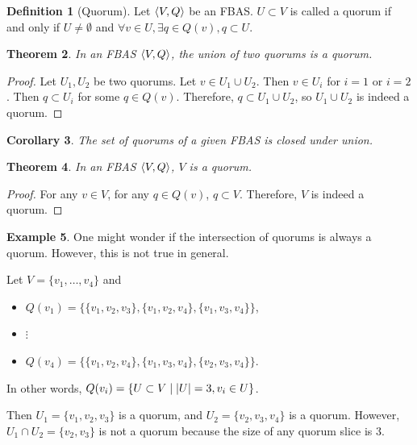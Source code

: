 \documentclass[12pt, psamsfonts]{amsart}
\newtheorem{thm}{Theorem}[subsection]
\newtheorem{cor}[thm]{Corollary}
\theoremstyle{definition}
\newtheorem{defn}[thm]{Definition}
\newtheorem{exmp}[thm]{Example}
\theoremstyle{remark}
\numberwithin{equation}{subsection}
\begin{document}
\begin{defn}[Quorum]
    Let $\ev{V, Q}$ be an FBAS\@.
    $U \subset V$ is called a quorum if and only if $U \ne \emptyset$ and $\forall v \in U, \exists q \in Q(v), q \subset U$.
\end{defn}

\begin{thm}\label{union_quorums}
    In an FBAS $\ev{V, Q}$, the union of two quorums is a quorum.
\end{thm}

\begin{proof}
    Let $U_1, U_2$ be two quorums.
    Let $v \in U_1 \cup U_2$.
    Then $v \in U_i$ for $i = 1$ or $i = 2$.
    Then $q \subset U_i$ for some $q \in Q(v)$.
    Therefore, $q \subset U_1 \cup U_2$, so $U_1 \cup U_2$ is indeed a quorum.
\end{proof}

\begin{cor}
    The set of quorums of a given FBAS is closed under union.
\end{cor}

\begin{thm}
    In an FBAS $\ev{V, Q}$, $V$ is a quorum.
\end{thm}

\begin{proof}
    For any $v \in V$, for any $q \in Q(v)$, $q \subset V$.
    Therefore, $V$ is indeed a quorum.
\end{proof}

\begin{exmp}
    One might wonder if the intersection of quorums is always a quorum.
    However, this is not true in general.

    Let $V = \{ v_1, \ldots, v_4 \}$ and
    \begin{itemize}
        \item
            $Q(v_1) = \{ \{ v_1, v_2, v_3 \}, \{ v_1, v_2, v_4 \}, \{ v_1, v_3, v_4 \} \}$,
        \item
            $\vdots$
        \item
            $Q(v_4) = \{ \{ v_1, v_2, v_4 \}, \{ v_1, v_3, v_4 \}, \{ v_2, v_3, v_4 \} \}$.
    \end{itemize}

    In other words, $Q(v_i) = \{ U \subset V \mid \abs{U} = 3, v_i \in U \}$.

    Then $U_1 = \{ v_1, v_2, v_3 \}$ is a quorum, and $U_2 = \{ v_2, v_3, v_4 \}$ is a quorum.
    However, $U_1 \cap U_2 = \{ v_2, v_3 \}$ is not a quorum because the size of any quorum slice is 3.
\end{exmp}
\end{document}

